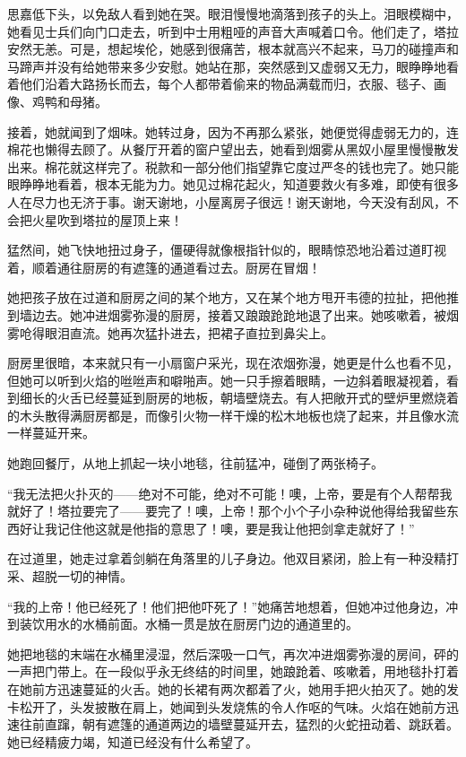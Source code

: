 \par 思嘉低下头，以免敌人看到她在哭。眼泪慢慢地滴落到孩子的头上。泪眼模糊中，她看见士兵们向门口走去，听到中士用粗哑的声音大声喊着口令。他们走了，塔拉安然无恙。可是，想起埃伦，她感到很痛苦，根本就高兴不起来，马刀的碰撞声和马蹄声并没有给她带来多少安慰。她站在那，突然感到又虚弱又无力，眼睁睁地看着他们沿着大路扬长而去，每个人都带着偷来的物品满载而归，衣服、毯子、画像、鸡鸭和母猪。
\par 接着，她就闻到了烟味。她转过身，因为不再那么紧张，她便觉得虚弱无力的，连棉花也懒得去顾了。从餐厅开着的窗户望出去，她看到烟雾从黑奴小屋里慢慢散发出来。棉花就这样完了。税款和一部分他们指望靠它度过严冬的钱也完了。她只能眼睁睁地看着，根本无能为力。她见过棉花起火，知道要救火有多难，即使有很多人在尽力也无济于事。谢天谢地，小屋离房子很远！谢天谢地，今天没有刮风，不会把火星吹到塔拉的屋顶上来！
\par 猛然间，她飞快地扭过身子，僵硬得就像根指针似的，眼睛惊恐地沿着过道盯视着，顺着通往厨房的有遮篷的通道看过去。厨房在冒烟！
\par 她把孩子放在过道和厨房之间的某个地方，又在某个地方甩开韦德的拉扯，把他推到墙边去。她冲进烟雾弥漫的厨房，接着又踉踉跄跄地退了出来。她咳嗽着，被烟雾呛得眼泪直流。她再次猛扑进去，把裙子直拉到鼻尖上。
\par 厨房里很暗，本来就只有一小扇窗户采光，现在浓烟弥漫，她更是什么也看不见，但她可以听到火焰的咝咝声和噼啪声。她一只手擦着眼睛，一边斜着眼凝视着，看到细长的火舌已经蔓延到厨房的地板，朝墙壁烧去。有人把敞开式的壁炉里燃烧着的木头散得满厨房都是，而像引火物一样干燥的松木地板也烧了起来，并且像水流一样蔓延开来。
\par 她跑回餐厅，从地上抓起一块小地毯，往前猛冲，碰倒了两张椅子。
\par “我无法把火扑灭的——绝对不可能，绝对不可能！噢，上帝，要是有个人帮帮我就好了！塔拉要完了——要完了！噢，上帝！那个小个子小杂种说他得给我留些东西好让我记住他这就是他指的意思了！噢，要是我让他把剑拿走就好了！”
\par 在过道里，她走过拿着剑躺在角落里的儿子身边。他双目紧闭，脸上有一种没精打采、超脱一切的神情。
\par “我的上帝！他已经死了！他们把他吓死了！”她痛苦地想着，但她冲过他身边，冲到装饮用水的水桶前面。水桶一贯是放在厨房门边的通道里的。
\par 她把地毯的末端在水桶里浸湿，然后深吸一口气，再次冲进烟雾弥漫的房间，砰的一声把门带上。在一段似乎永无终结的时间里，她踉跄着、咳嗽着，用地毯扑打着在她前方迅速蔓延的火舌。她的长裙有两次都着了火，她用手把火拍灭了。她的发卡松开了，头发披散在肩上，她闻到头发烧焦的令人作呕的气味。火焰在她前方迅速往前直蹿，朝有遮篷的通道两边的墙壁蔓延开去，猛烈的火蛇扭动着、跳跃着。她已经精疲力竭，知道已经没有什么希望了。
